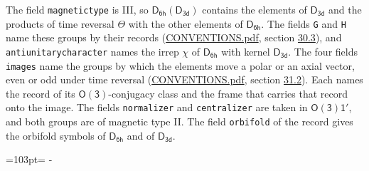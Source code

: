 \documentclass[10pt,a4paper]{article}
\newcommand{\needspace}[1]{\par\penalty-100\begingroup\dimen0=#1\relax\dimen2=\pagegoal
  \advance\dimen2-\pagetotal\ifdim\dimen0>\dimen2\relax\ifdim\dimen2>0pt\vfil\break\fi\fi
  \endgroup}
\numberwithin{equation}{section}
\newcommand{\grp}[1]{\mathsf{#1}}
\begin{document}
The field \texttt{magnetictype} is III, so $\grp{D_{6h}}(\grp{D_{3d}})$ contains the elements of $\grp{D_{3d}}$ and the products of time reversal $\varTheta$ with the other elements of $\grp{D_{6h}}$. The fields \texttt{G} and \texttt{H} name these groups by their records (\href{../../CONVENTIONS.pdf}{CONVENTIONS.pdf}, section \href{../../CONVENTIONS.pdf\#conv.30.3}{30.3}), and \texttt{antiunitarycharacter} names the irrep $\chi$ of $\grp{D_{6h}}$ with kernel $\grp{D_{3d}}$. The four fields \texttt{images} name the groups by which the elements move a polar or an axial vector, even or odd under time reversal (\href{../../CONVENTIONS.pdf}{CONVENTIONS.pdf}, section \href{../../CONVENTIONS.pdf\#conv.31.2}{31.2}). Each names the record of its $\grp{O(3)}$-conjugacy class and the frame that carries that record onto the image. The fields \texttt{normalizer} and \texttt{centralizer} are taken in $\grp{O(3)1'}$, and both groups are of magnetic type II. The field \texttt{orbifold} of the record gives the orbifold symbols of $\grp{D_{6h}}$ and of $\grp{D_{3d}}$.
\needspace{103pt}
\end{document}
